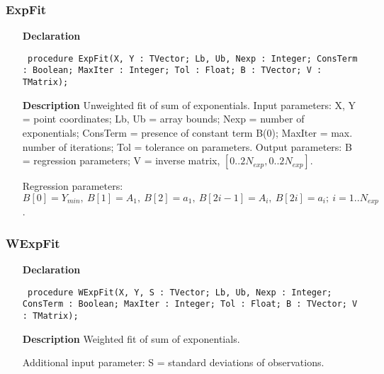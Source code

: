 \documentclass[12pt,a4paper,oneside]{report}
\newcommand{\declarationitem}[1]{\textbf{#1}}
\newcommand{\descriptiontitle}[1]{\textbf{#1}}
\newcommand{\code}[1]{\texttt{#1}}
\begin{document}
\subsubsection{ExpFit}
\label{uexpfit-ExpFit}
\begin{itemize}\item[\declarationitem{Declaration}\hfill]
	\begin{flushleft}
		\code{
			procedure ExpFit(X, Y : TVector; Lb, Ub, Nexp : Integer; ConsTerm : Boolean; MaxIter : Integer; Tol : Float; B : TVector; V : TMatrix);}
		
	\end{flushleft}
	
	\par
	\item[\descriptiontitle{Description}]
	Unweighted fit of sum of exponentials. Input parameters: X, Y = point coordinates; Lb, Ub = array bounds; Nexp = number of exponentials; ConsTerm = presence of constant term B(0); MaxIter = max. number of iterations; Tol = tolerance on parameters. Output parameters: B = regression parameters; V = inverse matrix, $[0..2N_{exp},0..2N_{exp}]$.
	
	Regression parameters: $B[0] = Y_{min},\	B[1] = A_1,\ B[2] = a_1,\ B[2 i-1] = A_i,\ B[2 i] = a_i;\ i = 1..N_{exp}$.
	
	
\end{itemize}
\subsubsection{WExpFit}
\label{uexpfit-WExpFit}
\begin{itemize}\item[\declarationitem{Declaration}\hfill]
	\begin{flushleft}
		\code{
			procedure WExpFit(X, Y, S : TVector; Lb, Ub, Nexp : Integer; ConsTerm : Boolean; MaxIter : Integer; Tol : Float; B : TVector; V : TMatrix);}
		
	\end{flushleft}
	
	\par
	\item[\descriptiontitle{Description}]
	Weighted fit of sum of exponentials.
	
	Additional input parameter: S = standard deviations of observations.
	
\end{itemize}
\end{document}
